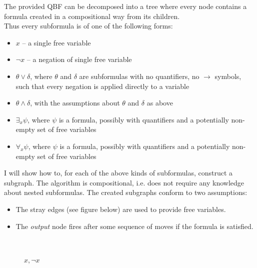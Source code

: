 \noindent
The provided QBF can be decomposed into a tree where every node contains a formula created in a compositional
way from its children.\\
Thus every subformula is of one of the following forms:
\begin{itemize}
      \item $x$ -- a single free variable
      \item $\lnot x$ -- a negation of single free variable
      \item $\theta \lor \delta$, where $\theta$ and $\delta$ are subformulas with no quantifiers, no $\rightarrow$ symbols,
            such that every negation is applied directly to a variable
      \item $\theta \land \delta$, with the assumptions about $\theta$ and $\delta$ as above
      \item $\exists_{x} \psi$, where $\psi$ is a formula, possibly with quantifiers and a potentially non-empty set of
            free variables
      \item $\forall_{x} \psi$, where $\psi$ is a formula, possibly with quantifiers and a potentially non-empty set of
            free variables
\end{itemize}
I will show how to, for each of the above kinds of subformulas, construct a subgraph. The algorithm
is compositional, i.e. does not require any knowledge about nested subformulas. The created subgraphs conform
to two assumptions:
\begin{itemize}
      \item The stray edges (see figure below) are used to provide free variables.
      \item The \textit{output} node fires after some sequence of moves if the formula is satisfied.
\end{itemize}

\noindent
\begin{figure}[H]
      \centering
      \caption{$x, \lnot x$}
      \\
\end{figure}

